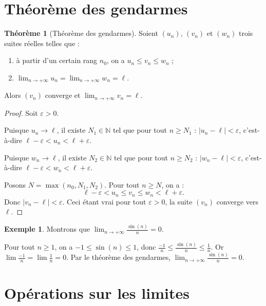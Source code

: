 \documentclass[12pt,a4paper,openany]{book}
\theoremstyle{definition}
\newtheorem{theoreme}{Théorème}[chapter]
\newtheorem{exemple}{Exemple}[chapter]
\newcommand{\N}{\mathbb{N}}
\newcommand{\eps}{\varepsilon}
\newcommand{\abs}[1]{\left\lvert #1 \right\rvert}
\begin{document}
\section{Théorème des gendarmes}\label{sec:suites:gendarmes}

\begin{theoreme}[Théorème des gendarmes]\label{thm:gendarmes}
  Soient $(u_n)$, $(v_n)$ et $(w_n)$ trois suites réelles telles que :
  \begin{enumerate}[label=(\roman*)]
    \item à partir d'un certain rang $n_0$, on a $u_n \leq v_n \leq w_n$ ;
    \item $\lim_{n \to +\infty} u_n = \lim_{n \to +\infty} w_n = \ell$.
  \end{enumerate}
  Alors $(v_n)$ converge et $\lim_{n \to +\infty} v_n = \ell$.
\end{theoreme}

\begin{proof}
  Soit $\eps > 0$.

  Puisque $u_n \to \ell$, il existe $N_1 \in \N$ tel que pour tout $n \geq N_1$ :
  $\abs{u_n - \ell} < \eps$, c'est-à-dire $\ell - \eps < u_n < \ell + \eps$.

  Puisque $w_n \to \ell$, il existe $N_2 \in \N$ tel que pour tout $n \geq N_2$ :
  $\abs{w_n - \ell} < \eps$, c'est-à-dire $\ell - \eps < w_n < \ell + \eps$.

  Posons $N = \max(n_0, N_1, N_2)$. Pour tout $n \geq N$, on a :
  \[
    \ell - \eps < u_n \leq v_n \leq w_n < \ell + \eps.
  \]
  Donc $\abs{v_n - \ell} < \eps$. Ceci étant vrai pour tout $\eps > 0$,
  la suite $(v_n)$ converge vers $\ell$.
\end{proof}

\begin{exemple}\label{ex:gendarmes-sin}
  Montrons que $\lim_{n \to +\infty} \frac{\sin(n)}{n} = 0$.

  Pour tout $n \geq 1$, on a $-1 \leq \sin(n) \leq 1$, donc
  $\frac{-1}{n} \leq \frac{\sin(n)}{n} \leq \frac{1}{n}$.
  Or $\lim \frac{-1}{n} = \lim \frac{1}{n} = 0$. Par le théorème des gendarmes,
  $\lim_{n \to +\infty} \frac{\sin(n)}{n} = 0$.
\end{exemple}

\section{Opérations sur les limites}\label{sec:suites:operations}
\end{document}
